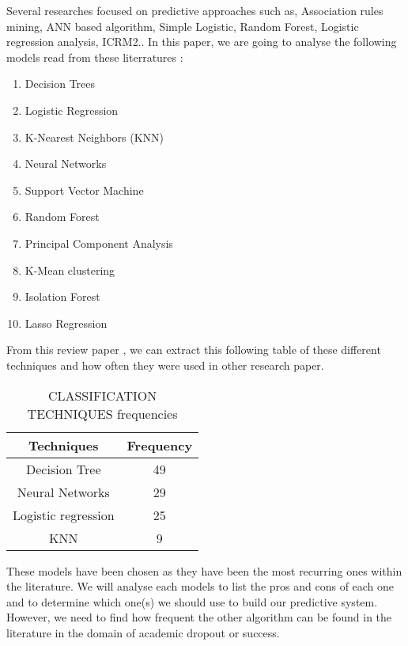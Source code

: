 \documentclass[../../main.tex]{subfiles}
\begin{document}
Several researches focused on predictive approaches such as, Association rules mining, ANN based algorithm, Simple Logistic, 
 Random Forest, Logistic regression analysis, ICRM2.\cite{mduma_survey_2019}. 
In this paper, we are going to analyse the following models read from these literratures \cite{mduma_survey_2019,quinlan_induction_1986,yadav_mining_2012,heredia_student_2015,ramirez_prediction_2018,cox_regression_1958,perez_modelo_2018,pandey_data_2011,cover_nearest_1967,mardolkar_forecasting_2020,zhang_neural_2000,rudin_stop_2019,siri_predicting_2015,m_alban_she_is_with_the_faculty_of_engineering_and_applied_sciences_of_the_technical_university_cotopaxi_neural_2019,boser_training_1992,lee_machine_2019,behr_early_2020,friedman_stochastic_2002,eckert_analysis_2015,tenpipat_student_2020,liang_machine_2016,liang_big_2016,fischer_angulo_modelo_2012,miranda_analysis_2017,viloria_integration_2019,kemper_predicting_2020,agrusti_university_2019}:
\begin{enumerate}
\item Decision Trees
\item Logistic Regression
\item K-Nearest Neighbors (KNN)
\item Neural Networks
\item Support Vector Machine
\item Random Forest
\item Principal Component Analysis
\item K-Mean clustering
\item Isolation Forest
\item Lasso Regression
\end{enumerate}

From this review paper \cite{agrusti_university_2019}, we can extract this following table of these different techniques and how often they were used in other research paper.
\begin{table}[H]
    \centering
    \caption{CLASSIFICATION TECHNIQUES frequencies\cite{agrusti_university_2019}}
    \begin{tabular}{|c|c|}
        \hline
        \textbf{Techniques} & \textbf{Frequency}\\
        \hline
        Decision Tree & 49\\
        \hline
        Neural Networks & 29\\
        \hline
        Logistic regression & 25\\
        \hline
        KNN & 9\\
        \hline
    \end{tabular}
    \label{tab:class_tech_freq_agrusti}
\end{table}
These models have been chosen as they have been the most recurring ones within the literature. We will analyse each models to list the pros and cons of each one and to determine which one(s) we should use to build our predictive system.
However, we need to find how frequent the other algorithm can be found in the literature in the domain of academic dropout or success.
\end{document}
